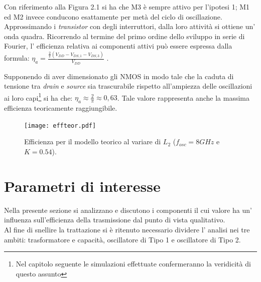\documentclass[a4paper, 12pt]{memoir}
\begin{document}
Con riferimento alla Figura 2.1 si ha che M3 è sempre attivo per l'ipotesi 1;
M1 ed M2 invece conducono esattamente per metà del ciclo di oscillazione.\\
Approssimando i \emph{transistor} con degli interruttori, dalla loro attività
si ottiene un' onda quadra. Ricorrendo al termine del primo ordine dello 
sviluppo in serie di Fourier, l' efficienza relativa ai componenti attivi può
essere espressa dalla formula:{\large
$\eta_a=\frac{\frac{2}{\pi}\left(V_{DD}-V_{DS,1}-V_{DS,3}\right)}{V_{DD}}$}
\cite{Neviani14}.

Supponendo di aver dimensionato gli NMOS in modo tale che la caduta di tensione
tra \emph{drain} e \emph{source} sia trascurabile rispetto all'ampiezza delle
oscillazioni ai loro capi\footnote{Nel capitolo seguente le simulazioni
effettuate confermeranno la veridicità di questo assunto} si ha che: {\large 
$\eta_a \approx \frac{2}{\pi} \approx 0,63$}. Tale valore rappresenta anche la
massima efficienza teoricamente raggiungibile.
\begin{figure}[h]
\centering
\texttt{[image: effteor.pdf]}
\caption{Efficienza per il modello teorico al variare di $L_2$ ($f_{osc} = 8GHz 
$ e $K=0.54 $).}
\end{figure}
\clearpage

\section{Parametri di interesse}
Nella presente sezione si analizzano e discutono i componenti il cui valore ha
un' influenza sull'efficienza della trasmissione dal punto di vista qualitativo.
\\Al fine di snellire la trattazione si è ritenuto necessario dividere l'
analisi nei tre ambiti: trasformatore e capacità, oscillatore di Tipo 1 e
oscillatore di Tipo 2.
\end{document}
